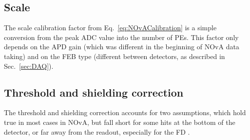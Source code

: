 
\subsection{Scale}
The scale calibration factor from Eq.~\ref{eq:NOvACalibration} is a simple conversion from the peak \gls{ADC} value into the number of \glspl{PE}. This factor only depends on the \gls{APD} gain (which was different in the beginning of \gls{NOvA} data taking) and on the \gls{FEB} type (different between detectors, as described in Sec.~\ref{sec:DAQ}).

\subsection{Threshold and shielding correction}\label{sec:NOvACalibTSCorr}
The threshold and shielding correction accounts for two assumptions, which hold true in most cases in \gls{NOvA}, but fall short for some hits at the bottom of the detector, or far away from the readout, especially for the \gls{FD} \cite{PrabhjotNOvAThesis_CalibrationAndOscResults2019.pdf}.

